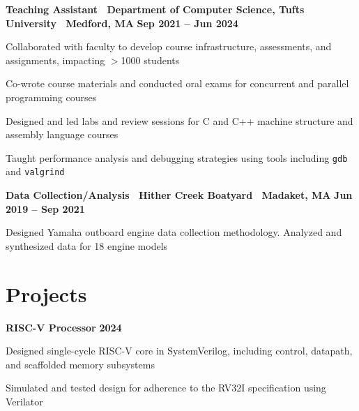 \documentclass[10pt]{article}
\newenvironment{mylist}[1][]
{\itemize[nosep, wide=0pt, leftmargin=*, after=\strut]}
{\enditemize}
\begin{document}
\begin{minipage}[t]{\linewidth}
    \textbf{Teaching Assistant \textbar \ Department of Computer Science, Tufts University \textbar \ Medford, MA} \hfill \textbf{Sep 2021 -- Jun 2024}
    \begin{mylist} 
        \item Collaborated with faculty to develop course infrastructure, assessments, and assignments, impacting $>$1000 students
        \item Co-wrote course materials and conducted oral exams for concurrent and parallel programming courses
        \item Designed and led labs and review sessions for C and C++ machine structure and assembly language courses
        \item Taught performance analysis and debugging strategies using tools including \texttt{gdb} and \texttt{valgrind}
    \end{mylist}
\end{minipage}

\begin{minipage}[t]{\linewidth}
    \textbf{Data Collection/Analysis \textbar \ Hither Creek Boatyard \textbar \ Madaket, MA} \hfill \textbf{Jun 2019 -- Sep 2021}
    \begin{mylist}
        \item Designed Yamaha outboard engine data collection methodology. Analyzed and synthesized data for 18 engine models
    \end{mylist}
\end{minipage}


\section{Projects}

\begin{minipage}[t]{\linewidth}
    \textbf{RISC-V Processor} \hfill \textbf{2024}
    \begin{mylist}
    \item Designed single-cycle RISC-V core in SystemVerilog, including control, datapath, and scaffolded memory subsystems
    \item Simulated and tested design for adherence to the RV32I specification using Verilator
    \end{mylist}
\end{minipage}
\end{document}
